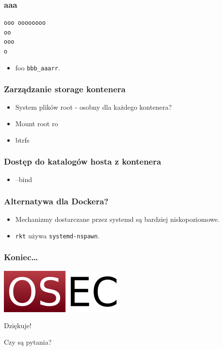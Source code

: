 \documentclass[dvipsnames,table]{beamer}
\begin{document}
\begin{frame}[fragile]
\frametitle{aaa}
\scriptsize
\begin{verbatim}
ooo oooooooo
oo
ooo
o
\end{verbatim}
\normalsize
\begin{itemize}
	\item foo {\tt bbb\_aaarr}.
\end{itemize}

\end{frame}

\begin{frame}
	\frametitle{Zarządzanie storage kontenera}
	\begin{itemize}
		\item System plików root - osobny dla każdego kontenera?
		\item Mount root ro
		\item btrfs
	\end{itemize}
\end{frame}

\begin{frame}
	\frametitle{Dostęp do katalogów hosta z kontenera}
	\begin{itemize}
		\item --bind
	\end{itemize}
\end{frame}

\begin{frame}
\frametitle{Alternatywa dla Dockera?}
\begin{itemize}
	\item Mechanizmy dostarczane przez systemd są bardziej niskopoziomowe.
	\item {\tt rkt} używa {\tt systemd-nspawn}.
\end{itemize}	
\end{frame}
\begin{frame}

\frametitle{Koniec\ldots}
\begin{center}
\includegraphics[scale=0.5]{img-oseclogo.png}

Dziękuje!

Czy są pytania?

\end{center}

\end{frame}
 
\end{document}
